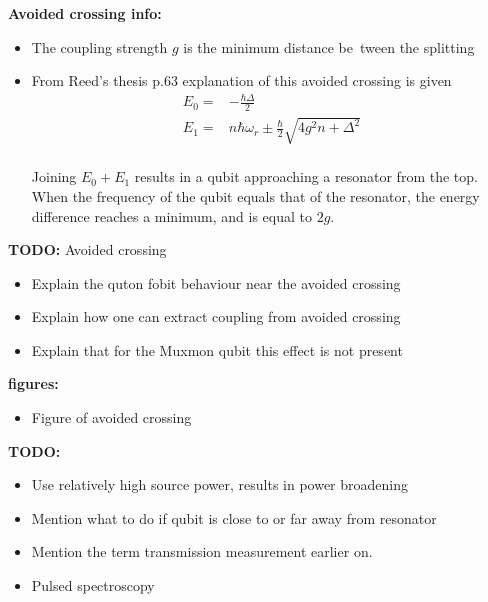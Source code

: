 \documentclass[12pt]{report}
\begin{document}
          \textbf{Avoided crossing info:}
          \begin{itemize}
            \item The coupling strength $g$ is the minimum distance be~tween the splitting
            \item From Reed's thesis p.63 explanation of this avoided crossing is given\\
            \begin{align}
             E_0 = & -\frac{\hbar \Delta}{2}\\
             E_1 = & n \hbar\omega_r \pm \frac{\hbar}{2}\sqrt{4g^2n + \Delta^2}
            \end{align}\\
            Joining $E_0 + E_1$ results in a qubit approaching a resonator from the top.\\
            When the frequency of the qubit equals that of the resonator, the energy difference reaches a minimum, and is equal to $2g$.
          \end{itemize}

          \textbf{TODO:} Avoided crossing
          \begin{itemize}
            \item Explain the quton fobit behaviour near the avoided crossing
            \item Explain how one can extract coupling from avoided crossing
            \item Explain that for the Muxmon qubit this effect is not present
          \end{itemize}

          \textbf{figures:}
          \begin{itemize}
            \item Figure of avoided crossing
          \end{itemize}


        \textbf{TODO:}
        \begin{itemize}
          \item Use relatively high source power, results in power broadening
          \item Mention what to do if qubit is close to or far away from resonator
          \item Mention the term transmission measurement earlier on.
          \item Pulsed spectroscopy
        \end{itemize}
\end{document}
